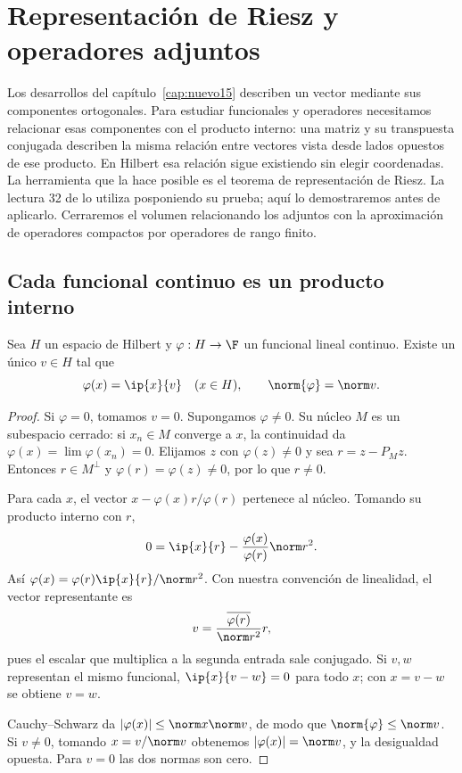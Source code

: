 \chapter{Representación de Riesz y operadores adjuntos}\label{cap:nuevo16}\label{chap:32}

Los desarrollos del capítulo~\ref{cap:nuevo15} describen un vector mediante sus componentes ortogonales. Para estudiar funcionales y operadores necesitamos relacionar esas componentes con el producto interno: una matriz y su transpuesta conjugada describen la misma relación entre vectores vista desde lados opuestos de ese producto. En Hilbert esa relación sigue existiendo sin elegir coordenadas. La herramienta que la hace posible es el teorema de representación de Riesz. La lectura 32 de \cite{valencia} lo utiliza posponiendo su prueba; aquí lo demostraremos antes de aplicarlo. Cerraremos el volumen relacionando los adjuntos con la aproximación de operadores compactos por operadores de rango finito.

\section{Cada funcional continuo es un producto interno}
\label{lectura:32}
\begin{teorema}\label{ch32:riesz}
Sea $H$ un espacio de Hilbert y $\varphi:H\to\F$ un funcional lineal continuo. Existe un único $v\in H$ tal que
\[
 \varphi(x)=\ip{x}{v}\quad(x\in H),\qquad \norm{\varphi}=\norm v.
\]
\end{teorema}
\begin{proof}
Si $\varphi=0$, tomamos $v=0$. Supongamos $\varphi\ne0$. Su núcleo $M$ es un subespacio cerrado: si $x_n\in M$ converge a $x$, la continuidad da $\varphi(x)=\lim\varphi(x_n)=0$. Elijamos $z$ con $\varphi(z)\ne0$ y sea $r=z-P_Mz$. Entonces $r\in M^{\perp}$ y $\varphi(r)=\varphi(z)\ne0$, por lo que $r\ne0$.

Para cada $x$, el vector $x-\varphi(x)r/\varphi(r)$ pertenece al núcleo. Tomando su producto interno con $r$,
\[
0=\ip{x}{r}-\frac{\varphi(x)}{\varphi(r)}\norm r^{2}.
\]
Así $\varphi(x)=\varphi(r)\ip{x}{r}/\norm r^{2}$. Con nuestra convención de linealidad, el vector representante es
\[
 v=\frac{\overline{\varphi(r)}}{\norm r^{2}}r,
\]
pues el escalar que multiplica a la segunda entrada sale conjugado. Si $v,w$ representan el mismo funcional, $\ip{x}{v-w}=0$ para todo $x$; con $x=v-w$ se obtiene $v=w$.

Cauchy--Schwarz da $|\varphi(x)|\leq\norm x\norm v$, de modo que $\norm{\varphi}\leq\norm v$. Si $v\ne0$, tomando $x=v/\norm v$ obtenemos $|\varphi(x)|=\norm v$, y la desigualdad opuesta. Para $v=0$ las dos normas son cero.
\end{proof}

